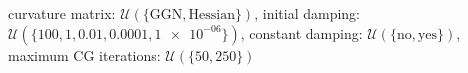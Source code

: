curvature matrix: $\mathcal{U}(\{\text{GGN},\text{Hessian}\})$, initial damping: $\mathcal{U}(\{\num[scientific-notation=false]{100},\num[scientific-notation=false]{1},\num[scientific-notation=true]{0.01},\num[scientific-notation=true]{0.0001},\num[scientific-notation=true]{1e-06}\})$, constant damping: $\mathcal{U}(\{\text{no},\text{yes}\})$, maximum CG iterations: $\mathcal{U}(\{\num[scientific-notation=false]{50},\num[scientific-notation=false]{250}\})$